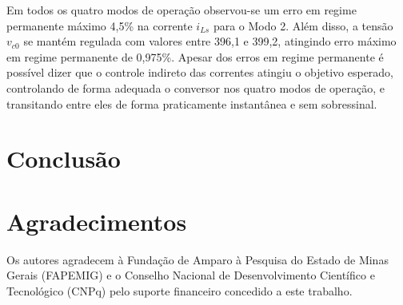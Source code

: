 Em todos os quatro modos de operação observou-se um erro em regime permanente máximo 4,5\% na corrente $i_{Ls}$ para o Modo 2. Além disso, a tensão $v_{c0}$ se mantém regulada com valores entre 396,1 e 399,2, atingindo erro máximo em regime permanente de 0,975\%. Apesar dos erros em regime permanente é possível dizer que o controle indireto das correntes atingiu o objetivo esperado, controlando de forma adequada o conversor nos quatro modos de operação, e transitando entre eles de forma praticamente instantânea e sem sobressinal. 






\section{Conclusão}





\section*{Agradecimentos}

Os autores agradecem à Fundação de Amparo à Pesquisa do Estado de Minas Gerais (FAPEMIG) e o Conselho Nacional de Desenvolvimento Científico e Tecnológico (CNPq) pelo suporte financeiro concedido a este trabalho.
